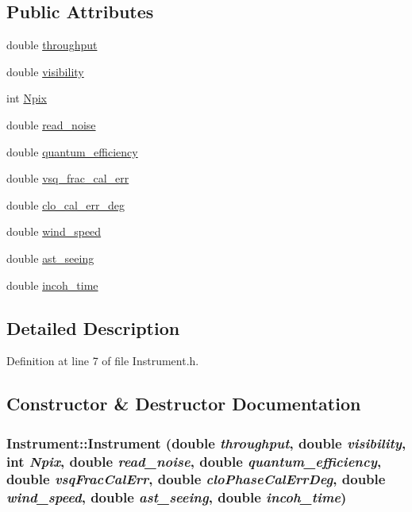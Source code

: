 \subsection*{Public Attributes}
\begin{DoxyCompactItemize}
\item 
double \hyperlink{classInstrument_a24c5a78025ce2474443eb34b8828df08}{throughput}
\item 
double \hyperlink{classInstrument_a8a79a07bd650ab75118beff9f46886a6}{visibility}
\item 
int \hyperlink{classInstrument_a349e2122c222f16ed712b5fb8660adb4}{Npix}
\item 
double \hyperlink{classInstrument_accb5f463e89c0c73d4c0e5b6b80397af}{read\_\-noise}
\item 
double \hyperlink{classInstrument_af352575aa1a6bb255db663a53fbb2b8b}{quantum\_\-efficiency}
\item 
double \hyperlink{classInstrument_ad51820f02768c7632da7d9136ace806f}{vsq\_\-frac\_\-cal\_\-err}
\item 
double \hyperlink{classInstrument_a755a26a3b1c7ea48fdcf213371254068}{clo\_\-cal\_\-err\_\-deg}
\item 
double \hyperlink{classInstrument_a7e18ced4e4e556e5203c046c2ebb3c63}{wind\_\-speed}
\item 
double \hyperlink{classInstrument_a508dcac890549428696372a66ed5d3bc}{ast\_\-seeing}
\item 
double \hyperlink{classInstrument_ab431265cc3192bfcc9ceeafd1d30605b}{incoh\_\-time}
\end{DoxyCompactItemize}


\subsection{Detailed Description}


Definition at line 7 of file Instrument.h.



\subsection{Constructor \& Destructor Documentation}
\hypertarget{classInstrument_af68972d40961b639787c594e3d62857e}{
\subsubsection[{Instrument}]{\setlength{\rightskip}{0pt plus 5cm}Instrument::Instrument (double {\em throughput}, \/  double {\em visibility}, \/  int {\em Npix}, \/  double {\em read\_\-noise}, \/  double {\em quantum\_\-efficiency}, \/  double {\em vsqFracCalErr}, \/  double {\em cloPhaseCalErrDeg}, \/  double {\em wind\_\-speed}, \/  double {\em ast\_\-seeing}, \/  double {\em incoh\_\-time})}}
\label{classInstrument_af68972d40961b639787c594e3d62857e}


